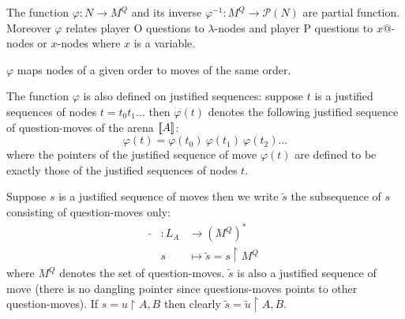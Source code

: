 The function $\varphi : N \rightarrow M^Q$ and its inverse
$\varphi^{-1} : M^Q \rightarrow \mathcal{P}(N)$ are partial function.
Moreover $\varphi$ relates player O questions to $\lambda$-nodes
and player P questions to $x @$-nodes or $x$-nodes where $x$ is a variable.

\begin{property}
\label{proper:phi_conserve_order}
$\varphi$ maps nodes of a given order to moves of the same order.
\end{property}


The function $\varphi$ is also defined on justified sequences: suppose $t$
is a justified sequences of nodes $t = t_0 t_1 \ldots$ then $\varphi(t)$ denotes
the following justified sequence of question-moves of the arena ${[\![ A ]\!]}$:
$$\varphi(t) = \varphi(t_0)\ \varphi(t_1)\  \varphi(t_2) \ldots$$
where the pointers of the justified sequence of move $\varphi(t)$ are defined to be exactly those
of the justified sequences of nodes $t$.

\begin{dfn}
Suppose $s$ is a justified sequence of moves then we write $\tilde{s}$
the subsequence of $s$ consisting of question-moves only:
\begin{eqnarray*}
\tilde{} &: L_A &\longrightarrow (M^Q)^* \\
& s &\longmapsto \tilde{s} = s \upharpoonright M^Q
\end{eqnarray*}
where $M^Q$ denotes the set of question-moves.
$\tilde{s}$ is also a justified sequence of move (there is no dangling pointer since questions-moves points to other question-moves).
If $s = u\upharpoonright A,B$ then clearly $\tilde{s} = \tilde{u} \upharpoonright A,B$.
\end{dfn}



